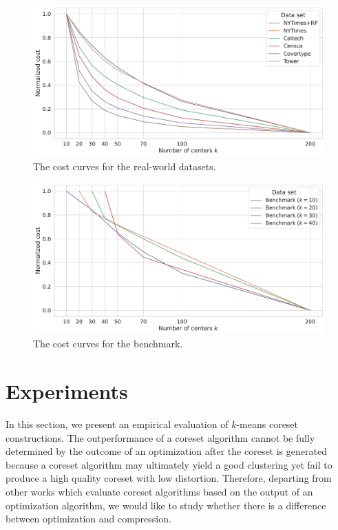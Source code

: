 
\begin{figure}
  \caption{The cost curves for the real-world datasets.}
  \label{fig:cost-curves-real-world-datasets}
  \includegraphics[width=1\linewidth]{figures/cost-curves-real-world-datasets.pdf}
\end{figure}


\begin{figure}
  \caption{The cost curves for the benchmark.}
  \label{fig:cost-curves-benchmark}
  \includegraphics[width=1\linewidth]{figures/cost-curves-benchmark.pdf}
\end{figure}


\section{Experiments} \label{sec:experiments}
In this section, we present an empirical evaluation of $k$-means coreset constructions.
The outperformance of a coreset algorithm cannot be fully determined by the outcome of an optimization after the coreset is generated because a coreset algorithm may ultimately yield a good clustering yet fail to produce a high quality coreset with low distortion.
Therefore, departing from other works which evaluate coreset algorithms based on the output of an optimization algorithm, we would like to study whether there is a difference between optimization and compression.


